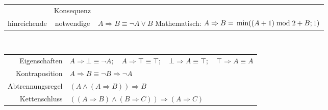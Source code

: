\begin{description}
\begin{description}
\begin{tabularx}{\linewidth}{c|c|X}
\begin{tabular}[t]{c|c}
                Voraussetzung & Konsequenz \\
                hinreichende  & notwendige
            \end{tabular}      &
            $A \Rightarrow B \equiv \neg A \vee B$ \newline
            Mathematisch: $A \Rightarrow B = \newline \min((A + 1) \bmod 2 + B; 1)$ \\ \hline
        \end{tabularx} \\
        \begin{tabular}[t]{rl}
            Eigenschaften    & $A \Rightarrow \bot \equiv \neg A; \quad A \Rightarrow \top \equiv \top; \quad \bot \Rightarrow A \equiv \top; \quad \top \Rightarrow A \equiv A$ \\
            Kontraposition   & $A \Rightarrow B \equiv \neg B \Rightarrow \neg A$                                                                                                \\
            Abtrennungsregel & $(A \wedge (A \Rightarrow B)) \Rightarrow B$                                                                                                      \\
            Kettenschluss    & $((A \Rightarrow B) \wedge (B \Rightarrow C)) \Rightarrow (A \Rightarrow C)$
        \end{tabular}


\end{description}
\end{description}
